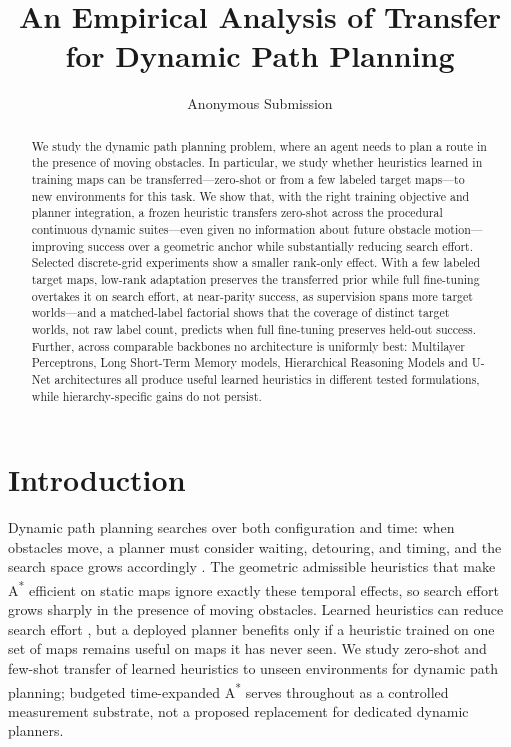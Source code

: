 \documentclass[letterpaper]{article} %
\title{An Empirical Analysis of Transfer for Dynamic Path Planning}
\author{
    Anonymous Submission
}
\begin{document}
\maketitle

\begin{abstract}
We study the dynamic path planning problem, where an agent needs to plan a route in the presence of moving obstacles. In particular, we study whether heuristics learned in training maps can be transferred---zero-shot or from a few labeled target maps---to new environments for this task. We show that, with the right training objective and planner integration, a frozen heuristic transfers zero-shot across the procedural continuous dynamic suites---even given no information about future obstacle motion---improving success over a geometric anchor while substantially reducing search effort. Selected discrete-grid experiments show a smaller rank-only effect. With a few labeled target maps, low-rank adaptation preserves the transferred prior while full fine-tuning overtakes it on search effort, at near-parity success, as supervision spans more target worlds---and a matched-label factorial shows that the coverage of distinct target worlds, not raw label count, predicts when full fine-tuning preserves held-out success. Further, across comparable backbones no architecture is uniformly best: Multilayer Perceptrons, Long Short-Term Memory models, Hierarchical Reasoning Models and U-Net architectures all produce useful learned heuristics in different tested formulations, while hierarchy-specific gains do not persist.
\end{abstract}

\section{Introduction}

Dynamic path planning searches over both configuration and time: when obstacles move, a planner must consider waiting, detouring, and timing, and the search space grows accordingly \citep{silver2005cooperative,phillips2011sipp}. The geometric admissible heuristics that make A\textsuperscript{*} \citep{hart1968astar} efficient on static maps ignore exactly these temporal effects, so search effort grows sharply in the presence of moving obstacles. Learned heuristics can reduce search effort \citep{arfaee2011bootstrap,bhardwaj2017sail,yonetani2021neuralastar}, but a deployed planner benefits only if a heuristic trained on one set of maps remains useful on maps it has never seen. We study zero-shot and few-shot transfer of learned heuristics to unseen environments for dynamic path planning; budgeted time-expanded A\textsuperscript{*} serves throughout as a controlled measurement substrate, not a proposed replacement for dedicated dynamic planners.
\end{document}
